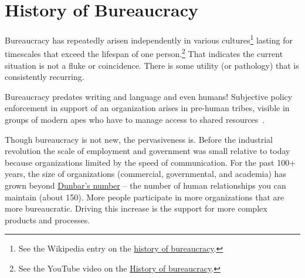 \section{History of Bureaucracy\label{sec:history}}


Bureaucracy has repeatedly arisen independently in various cultures\footnote{See the Wikipedia entry on the \href{https://en.wikipedia.org/wiki/Bureaucracy\%23History}{history of bureaucracy}.
}
lasting for timescales that exceed the lifespan of one person.\footnote{See the YouTube video on the \href{https://www.youtube.com/watch?v=B_nsZlcC12g}{History of bureaucracy}.} That indicates the current situation is not a fluke or coincidence. There is some utility (or pathology) that is consistently recurring. 


Bureaucracy predates writing and language and even humans! Subjective policy enforcement in support of an organization arises in pre-human tribes, visible in groups of modern apes who have to manage access to shared resources~\cite{2016_Suchak}. 



Though bureaucracy is not new, the pervasiveness is. Before the industrial revolution the scale of employment and government was small relative to today because organizations limited by the speed of communication. For the past 100+ years, the size of organizations (commercial, governmental, and academia) has grown beyond \href{https://en.wikipedia.org/wiki/Dunbar\%27s_number}{Dunbar's number} -- the number of human relationships you can maintain (about 150). \iftoggle{WPinmargin}{\marginpar{$>$Wikipedia: Dunbar's number}}{}
More people participate in more organizations that are more bureaucratic. Driving this increase is the support for more complex products and processes. 



